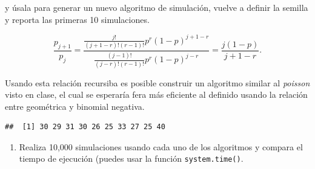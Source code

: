 \documentclass[]{article}
\newenvironment{Shaded}{\begin{snugshade}}{\end{snugshade}}
\newcommand{\ControlFlowTok}[1]{\textcolor[rgb]{0.13,0.29,0.53}{\textbf{#1}}}
\newcommand{\DecValTok}[1]{\textcolor[rgb]{0.00,0.00,0.81}{#1}}
\newcommand{\FloatTok}[1]{\textcolor[rgb]{0.00,0.00,0.81}{#1}}
\newcommand{\KeywordTok}[1]{\textcolor[rgb]{0.13,0.29,0.53}{\textbf{#1}}}
\newcommand{\NormalTok}[1]{#1}
\newcommand{\OperatorTok}[1]{\textcolor[rgb]{0.81,0.36,0.00}{\textbf{#1}}}
\newcommand{\StringTok}[1]{\textcolor[rgb]{0.31,0.60,0.02}{#1}}
\providecommand{\tightlist}{%
  \setlength{\itemsep}{0pt}\setlength{\parskip}{0pt}}
\begin{document}
y úsala para generar un nuevo algoritmo de simulación, vuelve a definir
la semilla y reporta las primeras 10 simulaciones.

\[ \frac{p_{j +1}}{p_j} = \frac{\frac{j!}{(j+1-r)!(r-1)!}p^r(1-p)^{j+1-r}}{\frac{(j-1)!}{(j-r)!(r-1)!}p^r(1-p)^{j-r}}= \frac{j(1 - p) }{j + 1 - r}.\]

Usando esta relación recursiba es posible construir un algoritmo similar
al \emph{poisson} visto en clase, el cual se esperaría fera más
eficiente al definido usando la relación entre geométrica y binomial
negativa.

\begin{Shaded}
\end{Shaded}

\begin{verbatim}
##  [1] 30 29 31 30 26 25 33 27 25 40
\end{verbatim}

\begin{enumerate}
\def\labelenumi{\alph{enumi})}
\setcounter{enumi}{3}
\tightlist
\item
  Realiza 10,000 simulaciones usando cada uno de los algoritmos y
  compara el tiempo de ejecución (puedes usar la función
  \texttt{system.time()}.
\end{enumerate}
\end{document}
